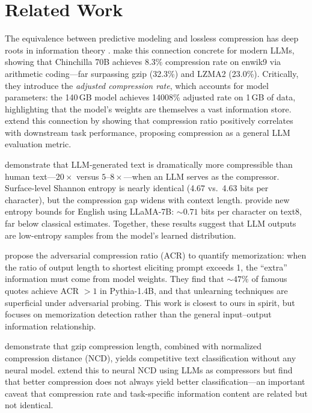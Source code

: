 \section{Related Work}
\label{sec:related}

The equivalence between predictive modeling and lossless compression has deep roots in information theory \cite{cover1999elements}. \citet{deletang2024language} make this connection concrete for modern LLMs, showing that Chinchilla 70B achieves 8.3\% compression rate on enwik9 via arithmetic coding---far surpassing gzip (32.3\%) and LZMA2 (23.0\%). Critically, they introduce the \emph{adjusted compression rate}, which accounts for model parameters: the 140\,GB model achieves 14008\% adjusted rate on 1\,GB of data, highlighting that the model's weights are themselves a vast information store. \citet{guo2024ranking} extend this connection by showing that compression ratio positively correlates with downstream task performance, proposing compression as a general LLM evaluation metric.

\citet{wang2025lossless} demonstrate that LLM-generated text is dramatically more compressible than human text---$20\times$ versus $5$--$8\times$---when an LLM serves as the compressor. Surface-level Shannon entropy is nearly identical (4.67 vs.\ 4.63 bits per character), but the compression gap widens with context length. \citet{valmeekam2023llmzip} provide new entropy bounds for English using LLaMA-7B: ${\sim}0.71$ bits per character on text8, far below classical estimates. Together, these results suggest that LLM outputs are low-entropy samples from the model's learned distribution.

\citet{schwarzschild2024adversarial} propose the adversarial compression ratio (ACR) to quantify memorization: when the ratio of output length to shortest eliciting prompt exceeds 1, the ``extra'' information must come from model weights. They find that ${\sim}47\%$ of famous quotes achieve ACR $> 1$ in Pythia-1.4B, and that unlearning techniques are superficial under adversarial probing. This work is closest to ours in spirit, but focuses on memorization detection rather than the general input--output information relationship.

\citet{jiang2023less} demonstrate that gzip compression length, combined with normalized compression distance (NCD), yields competitive text classification without any neural model. \citet{bao2024neural} extend this to neural NCD using LLMs as compressors but find that better compression does not always yield better classification---an important caveat that compression rate and task-specific information content are related but not identical.

